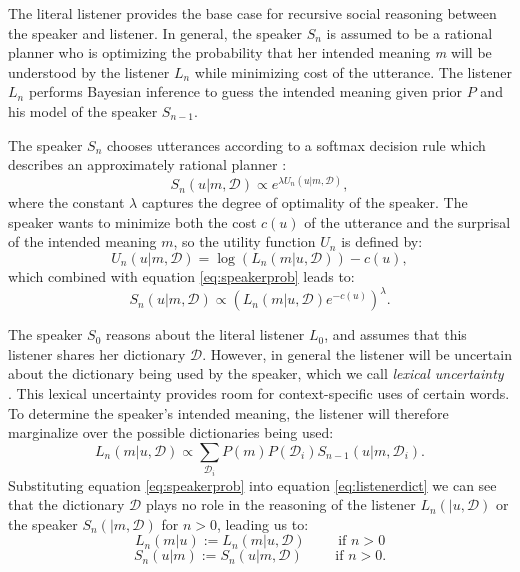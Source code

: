 \documentclass{article} %
\newcommand{\dictionary}{\ensuremath{\mathcal{D}}\xspace}
\begin{document}
The literal listener provides the base case for recursive social reasoning between the speaker and listener. In general, the speaker $S_n$ is assumed to be a rational planner who is optimizing the probability that her intended meaning \emph{m} will be understood by the listener $L_n$ while minimizing cost of the utterance. The listener $L_n$ performs Bayesian inference to guess the intended meaning given prior $P$ and his model of the speaker $S_{n-1}$.

The speaker $S_n$ chooses utterances according to a softmax decision rule which describes an approximately rational planner \cite{sutton1998reinforcement}:
\begin{equation}\label{eq:speakerprob}
S_n(u | m,\dictionary) \propto e^{\lambda U_n(u | m,\dictionary)},
\end{equation}
where the constant $\lambda$ captures the degree of optimality of the speaker. 
The speaker wants to minimize both the cost $c(u)$ of the utterance and the surprisal of the intended meaning $m$, so the utility function $U_n$ is defined by:
\begin{equation}\label{eq:speakerutility}
U_n(u | m, \dictionary) = \log (L_{n}(m | u, \dictionary)) - c(u),
\end{equation}
which combined with equation \ref{eq:speakerprob} leads to:
\begin{equation}\label{eq:speakersimplified}
S_n(u | m, \dictionary) \propto (L_{n}(m | u,\dictionary)e^{-c(u)}) ^\lambda.
\end{equation}

The speaker $S_0$ reasons about the literal listener $L_0$, and assumes that this listener shares her dictionary $\dictionary$. However, in general the listener will be uncertain about the dictionary being used by the speaker, which we call \emph{lexical uncertainty} \cite{bergen2012}. This lexical uncertainty provides room for context-specific uses of certain words. To determine the speaker's intended meaning, the listener will therefore marginalize over the possible dictionaries being used:
\begin{equation}\label{eq:listenerdict}
L_n(m|u,\dictionary) \propto \sum_{\dictionary_i }P(m)P(\dictionary_i)S_{n-1}(u | m,\dictionary_i).
\end{equation}
Substituting equation \ref{eq:speakerprob} into equation \ref{eq:listenerdict} we can see that the dictionary $\dictionary$ plays no role in the reasoning of the listener $L_n(|u,\dictionary)$ or the speaker $S_n(| m, \dictionary)$ for $n>0$, leading us to:
\begin{equation}
  L_n(m | u) :=  L_n(m | u, \dictionary) \text{ ~~~~~ if $n > 0$}
\end{equation}
\begin{equation}
  S_n(u | m) :=  S_n(u | m, \dictionary) \text{ ~~~~~ if $n > 0$.}
\end{equation}
\end{document}
